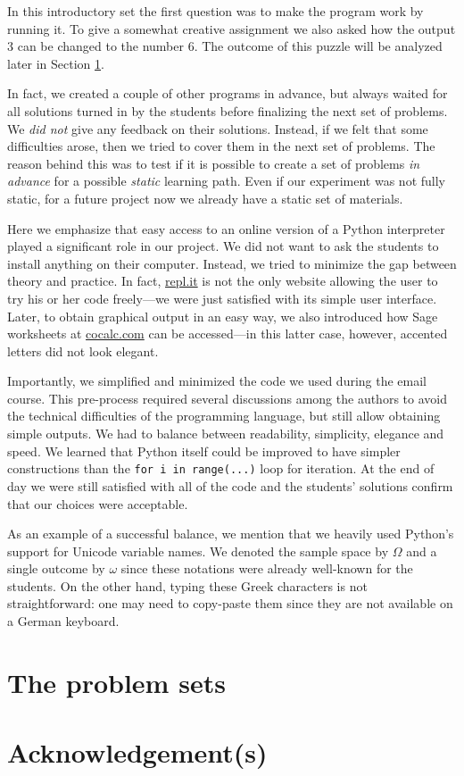 \documentclass[]{interact}
\theoremstyle{plain}%
\theoremstyle{definition}
\theoremstyle{remark}
\begin{document}
In this introductory set the first question was to make the program work by running it.
To give a somewhat creative assignment we also asked how the output 3 can be changed to
the number 6. The outcome of this puzzle will be analyzed later in Section \ref{problem-sets}.

In fact, we created a couple of other programs in advance, but always waited for
all solutions turned in by the students before finalizing the next set of problems.
We \textit{did not} give any feedback on their solutions. Instead, if we felt that
some difficulties arose, then we tried to cover them in the next set of problems.
The reason behind this was to test if it is possible to create a set of problems
\textit{in advance} for a possible \textit{static} learning path. Even if our experiment
was not fully static, for a future project now we already have a static set of materials.

Here we emphasize that easy access to an online version of a Python interpreter
played a significant role in our project. We did not want to ask the students
to install anything on their computer. Instead, we tried to minimize the gap
between theory and practice. In fact, \url{repl.it} is not the only website
allowing the user to try his or her code freely---we were just
satisfied with its simple user interface. Later, to obtain graphical output in an easy way, we also
introduced how Sage worksheets at \url{cocalc.com} can be accessed---in this latter case,
however, accented letters did not look elegant.

Importantly, we simplified and minimized the code we used during the email course.
This pre-process required several discussions among the authors to avoid
the technical difficulties of the programming language, but still allow
obtaining simple outputs. We had to balance between readability, simplicity,
elegance and speed. We learned that Python itself could be improved to
have simpler constructions than the \texttt{for i in range(...)} loop for iteration.
At the end of day we were still satisfied with all of the code and the students'
solutions confirm that our choices were acceptable.

As an example of a successful balance, we mention that we heavily used Python's support
for Unicode variable names.
We denoted the sample space by $\Omega$ and a single outcome by $\omega$ since
these notations were already well-known for the students. On the other hand,
typing these Greek characters is not straightforward: one may need to copy-paste
them since they are not available on a German keyboard.

\section{The problem sets}
\label{problem-sets}

\section*{Acknowledgement(s)}

\begin{thebibliography}{99}


\end{thebibliography}
\end{document}
